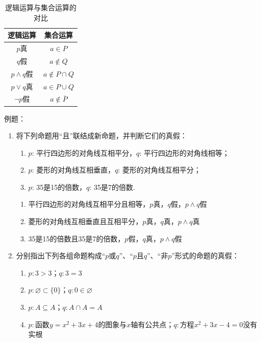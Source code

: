 \begin{table}[h]
    \centering
    \begin{tabular}{c|c}
        \hline
        逻辑运算 & 集合运算 \\
        \hline
        $p$真 & $a \in P$ \\
        $q$假 & $a \notin Q$ \\
        $p\land q$假 & $a \notin P \cap Q$ \\
        $p\vee q$真 & $a \in P \cup Q$ \\
        $\neg p$假 & $a \notin \overline{P}$ \\
        \hline
    \end{tabular}
    \caption{逻辑运算与集合运算的对比}
    \label{tab:LogicalConnectives}
\end{table}
例题：
\begin{enumerate}
    \item 将下列命题用“且”联结成新命题，并判断它们的真假：
    \begin{enumerate}
        \item $p$: 平行四边形的对角线互相平分，$q$: 平行四边形的对角线相等；
        \item $p$: 菱形的对角线互相垂直，$q$: 菱形的对角线互相平分；
        \item $p$: 35是15的倍数，$q$: 35是7的倍数.
    \end{enumerate}
    \begin{jieda}
        \begin{enumerate}
            \item 平行四边形的对角线互相平分且相等，$p$真，$q$假，$p \land q$假
            \item 菱形的对角线互相垂直且互相平分，$p$真，$q$真，$p \land q$真
            \item 35是15的倍数且35是7的倍数，$p$假，$q$真，$p \land q$假
        \end{enumerate}
    \end{jieda}
    \item 分别指出下列各组命题构成“$p$或$q$”、“$p$且$q$”、“非$p$”形式的命题的真假：
    \begin{enumerate}
        \item $p: 3>3$；$q: 3 = 3$
        \item $p: \varnothing \subset \{0\}$；$q: 0 \in \varnothing$
        \item $p: A \subseteq A$；$q: A \cap A = A$
        \item $p:$函数$y = x^2+3x+4$的图象与$x$轴有公共点；$q:$方程$x^2+3x-4 = 0$没有实根

\end{enumerate}
\end{enumerate}
